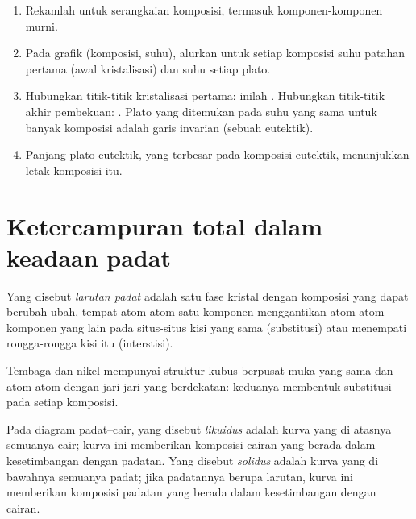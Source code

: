 \begin{method}\label{met:b2:solid-liquid-diagrams:diagram-from-curves}
\begin{enumerate}
  \item Rekamlah  untuk serangkaian komposisi, termasuk
        komponen-komponen murni.
  \item Pada grafik (komposisi, suhu), alurkan untuk setiap komposisi suhu
        patahan pertama (awal kristalisasi) dan suhu setiap plato.
  \item Hubungkan titik-titik kristalisasi pertama: inilah .
        Hubungkan titik-titik akhir pembekuan: . Plato yang
        ditemukan pada suhu yang sama untuk banyak komposisi adalah garis
        invarian (sebuah eutektik).
  \item Panjang plato eutektik, yang terbesar pada komposisi eutektik,
        menunjukkan letak komposisi itu.
\end{enumerate}
\end{method}

\section{Ketercampuran total dalam keadaan padat}

\begin{definition}\label{def:b2:solid-liquid-diagrams:solid-solution}
Yang disebut \emph{larutan padat} adalah satu fase
kristal dengan komposisi yang dapat berubah-ubah, tempat atom-atom satu
komponen menggantikan atom-atom komponen yang lain pada situs-situs kisi
yang sama (substitusi) atau menempati rongga-rongga kisi itu
(interstisi).
\end{definition}

Tembaga dan nikel mempunyai struktur kubus berpusat muka yang sama dan
atom-atom dengan jari-jari yang berdekatan: keduanya membentuk 
substitusi pada setiap komposisi.

\begin{definition}\label{def:b2:solid-liquid-diagrams:liquidus}
Pada diagram padat--cair, yang disebut \emph{likuidus}
adalah kurva yang di atasnya semuanya cair; kurva ini memberikan komposisi
cairan yang berada dalam kesetimbangan dengan padatan. Yang disebut
\emph{solidus} adalah kurva yang di bawahnya semuanya padat;
jika padatannya berupa larutan, kurva ini memberikan komposisi padatan yang
berada dalam kesetimbangan dengan cairan.
\end{definition}

